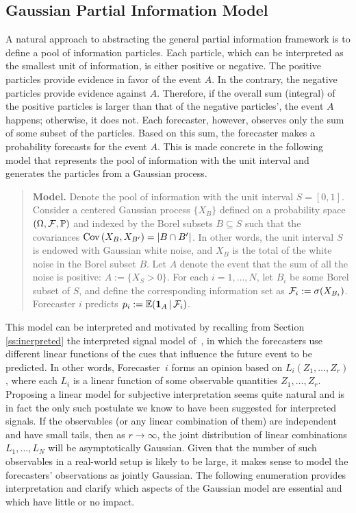\documentclass[11pt]{article}
\renewcommand{\P}{\mathbb{P}}
\newcommand{\E}{\mathbb{E}}
\theoremstyle{definition}
\theoremstyle{definition}
\def\one{{\bf 1}}
\def\F{{\cal F}}
\def\P{{\mathbb P}}
\def\E{{\mathbb E}}
\def\Cov{{\rm Cov}\,}
\def\|{\, | \,}
\begin{document}
\subsection{Gaussian Partial Information Model}
\label{ss:Gaussian}
A natural approach to abstracting the general partial information framework is to define a pool of information particles. Each particle, which can be interpreted as the smallest unit of information, is either positive or negative. The positive particles provide evidence in favor of the event $A$. 
In the contrary, the negative particles provide evidence against $A$. Therefore, if the overall sum (integral) of the positive particles is larger than that of the negative particles', the event $A$ happens; otherwise, it does not. Each forecaster, however, observes only the sum of some subset of the particles. Based on this sum, the forecaster makes a probability forecasts for the event $A$. This is made concrete in the following model that  represents the pool of information with the unit interval and generates the particles from a Gaussian process. 

\begin{quote}
{\bf Model.} Denote the pool of information with the unit interval $S = [0,1]$. Consider a centered Gaussian process $\{X_B\}$ defined on a probability space $(\Omega
, \F , \P)$ and indexed by the Borel subsets $B \subseteq S$ such that the
covariances $\Cov (X_B , X_{B'}) = |B \cap B'|$.  In other words, the
unit interval $S$ is endowed with Gaussian white noise, and $X_B$ is the
total of the white noise in the Borel subset $B$.  Let $A$ denote the
event that the sum of all the noise is positive: $A := \{ X_S > 0 \}$.
For each $i = 1, \dots, N$, let $B_i$ be some Borel subset of $S$, and
define the corresponding information set as $\F_i := \sigma (X_{B_i})$. Forecaster $i$ predicts $p_i :=
\E (\one_A \| \F_i)$.
\end{quote}

This model can be interpreted and motivated by recalling from Section \ref{ss:inerpreted} the interpreted signal
model of~\citet{broomell2009experts}, in which the forecasters
use different linear functions of the cues that influence the future event to be predicted.  In other words,
Forecaster~$i$ forms an opinion based on $L_i (Z_1 , \ldots , Z_r)$,
where each $L_i$ is a linear function of some observable quantities
$Z_1 , \ldots , Z_r$.  Proposing a linear model for subjective
interpretation seems quite natural and is in fact the only such
postulate we know to have been suggested for interpreted signals.  If
the observables (or any linear combination of them) are independent
and have small tails, then as $r \to \infty$, the joint distribution
of linear combinations $L_1 , \ldots , L_N$ will be asymptotically
Gaussian.  Given that the number of such observables in a real-world setup is likely to be large, it makes sense
to model the forecasters' observations as jointly Gaussian.  The
following enumeration provides interpretation and clarify which
aspects of the Gaussian model are essential and which have little or
no impact.
\end{document}
